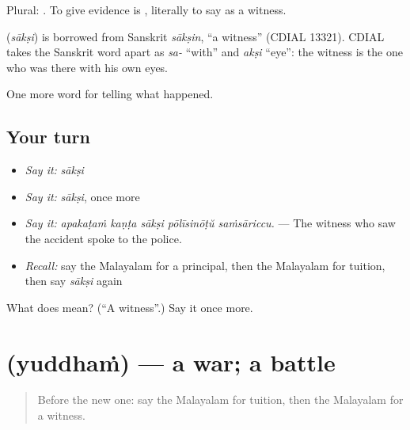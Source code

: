 Plural: . To give evidence is  , literally to say as a witness.

\begin{cousinweb}
\textbf{} (\emph{sākṣi}) is borrowed from Sanskrit \emph{sākṣin}, \textquotedblleft{}a witness\textquotedblright{} (CDIAL 13321). CDIAL takes the Sanskrit word apart as \emph{sa-} \textquotedblleft{}with\textquotedblright{} and \emph{akṣi} \textquotedblleft{}eye\textquotedblright{}: the witness is the one who was there with his own eyes.
\end{cousinweb}

\begin{grammarlens}[title={What you've built}]
One more word for telling what happened.
\end{grammarlens}

\subsection*{Your turn}
\begin{itemize}
\raggedright
  \item \emph{Say it:} \emph{sākṣi}
  \item \emph{Say it:} \emph{sākṣi}, once more
  \item \emph{Say it:} \emph{apakaṭaṁ kaṇṭa sākṣi pōlīsinōṭŭ saṁsāriccu.} — The witness who saw the accident spoke to the police.
  \item \emph{Recall:} say the Malayalam for a principal, then the Malayalam for tuition, then say \emph{sākṣi} again
\end{itemize}

\begin{tcolorbox}[breakable,colback=teal!4,colframe=teal!35!black,title={Before you move on}]
What does  mean? (\textquotedblleft{}A witness\textquotedblright{}.) Say it once more.
\end{tcolorbox}
\section[\texorpdfstring{\ml{യുദ്ധം} (yuddhaṁ)}{യുദ്ധം (yuddhaṁ)}]{ (yuddhaṁ) — a war; a battle}

\label{lesson:ML-C349-yuddham}



\begin{quote}
Before the new one: say the Malayalam for tuition, then the Malayalam for a witness.
\end{quote}

